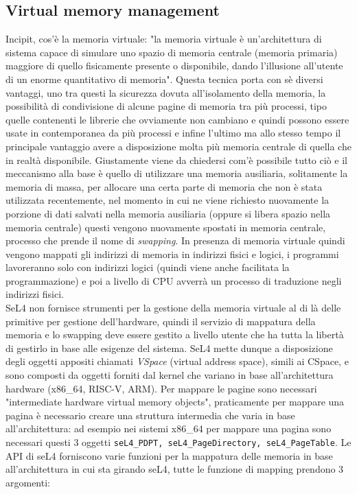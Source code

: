 \subsection{Virtual memory management}
Incipit, cos'è la memoria virtuale: "la memoria virtuale è un'architettura di sistema capace di simulare uno spazio di memoria centrale (memoria primaria) maggiore di quello fisicamente presente o disponibile, dando l'illusione all'utente di un enorme quantitativo di memoria". \cite{MemoriaVirtuale} Questa tecnica porta con sè diversi vantaggi, uno tra questi la sicurezza dovuta all'isolamento della memoria, la possibilità di condivisione di alcune pagine di memoria tra più processi, tipo quelle contenenti le librerie che ovviamente non cambiano e quindi possono essere usate in contemporanea da più processi e infine l'ultimo ma allo stesso tempo il principale vantaggio avere a disposizione molta più memoria centrale di quella che in realtà disponibile. Giustamente viene da chiedersi com'è possibile tutto ciò e il meccanismo alla base è quello di utilizzare una memoria ausiliaria, solitamente la memoria di massa, per allocare una certa parte di memoria che non è stata utilizzata recentemente, nel momento in cui ne viene richiesto nuovamente la porzione di dati salvati nella memoria ausiliaria (oppure si libera spazio nella memoria centrale) questi vengono nuovamente spostati in memoria centrale, processo che prende il nome di \textit{swapping}. In presenza di memoria virtuale quindi vengono mappati gli indirizzi di memoria in indirizzi fisici e logici, i programmi lavoreranno solo con indirizzi logici (quindi viene anche facilitata la programmazione) e poi a livello di CPU avverrà un processo di traduzione negli indirizzi fisici.\\
SeL4 non fornisce strumenti per la gestione della memoria virtuale al di là delle primitive per gestione dell'hardware, quindi il servizio di mappatura della memoria e lo swapping deve essere gestito a livello utente che ha tutta la libertà di gestirlo in base alle esigenze del sistema. SeL4 mette dunque a disposizione degli oggetti appositi chiamati \textit{VSpace} (virtual address space), simili ai CSpace, e sono composti da oggetti forniti dal kernel che variano in base all'architettura hardware (x86\_64, RISC-V, ARM). Per mappare le pagine sono necessari "intermediate hardware virtual memory objects", praticamente per mappare una pagina è necessario creare una struttura intermedia che varia in base all'architettura: ad esempio nei sistemi x86\_64 per mappare una pagina sono necessari questi 3 oggetti \texttt{seL4\_PDPT, seL4\_PageDirectory, seL4\_PageTable}. Le API di seL4 forniscono varie funzioni per la mappatura delle memoria in base all'architettura in cui sta girando seL4, tutte le funzione di mapping prendono 3 argomenti:
